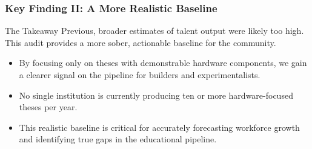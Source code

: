 \documentclass[aspectratio=169]{beamer}
\begin{document}
\begin{frame}
    \frametitle{Key Finding II: A More Realistic Baseline}
    
    \begin{alertblock}{The Takeaway}
        Previous, broader estimates of talent output were likely too high. This audit provides a more sober, actionable baseline for the community.
    \end{alertblock}
    
    \begin{itemize}
        \item By focusing only on theses with demonstrable hardware components, we gain a clearer signal on the pipeline for builders and experimentalists.
        \item No single institution is currently producing ten or more hardware-focused theses per year.
        \item This realistic baseline is critical for accurately forecasting workforce growth and identifying true gaps in the educational pipeline.
    \end{itemize}
\end{frame}
\end{document}
